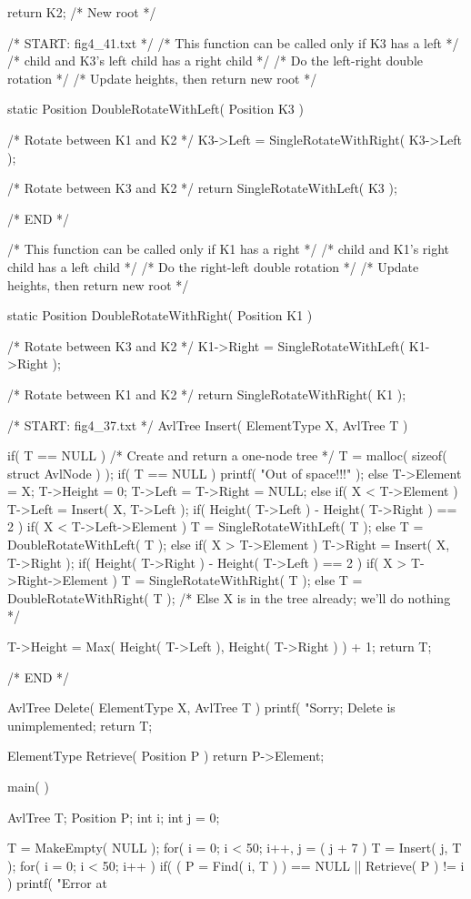 \documentclass[12pt, a4paper]{article}
\begin{document}
\begin{code}
{	return K2;  /* New root */
}

/* START: fig4_41.txt */
        /* This function can be called only if K3 has a left */
        /* child and K3's left child has a right child */
        /* Do the left-right double rotation */
        /* Update heights, then return new root */

static Position DoubleRotateWithLeft( Position K3 )
{
	/* Rotate between K1 and K2 */
	K3->Left = SingleRotateWithRight( K3->Left );

	/* Rotate between K3 and K2 */
	return SingleRotateWithLeft( K3 );
}
/* END */

/* This function can be called only if K1 has a right */
/* child and K1's right child has a left child */
/* Do the right-left double rotation */
/* Update heights, then return new root */

static Position DoubleRotateWithRight( Position K1 )
{
	/* Rotate between K3 and K2 */
	K1->Right = SingleRotateWithLeft( K1->Right );

	/* Rotate between K1 and K2 */
	return SingleRotateWithRight( K1 );
}


/* START: fig4_37.txt */
AvlTree Insert( ElementType X, AvlTree T )
{
	if( T == NULL )
	{
		/* Create and return a one-node tree */
		T = malloc( sizeof( struct AvlNode ) );
		if( T == NULL )
			printf( "Out of space!!!" );
		else
		{
			T->Element = X; T->Height = 0;
			T->Left = T->Right = NULL;
		}
	}
	else if( X < T->Element )
	{
		T->Left = Insert( X, T->Left );
		if( Height( T->Left ) - Height( T->Right ) == 2 )
			if( X < T->Left->Element )
				T = SingleRotateWithLeft( T );
			else
				T = DoubleRotateWithLeft( T );
	}
	else if( X > T->Element )
	{
		T->Right = Insert( X, T->Right );
		if( Height( T->Right ) - Height( T->Left ) == 2 )
			if( X > T->Right->Element )
				T = SingleRotateWithRight( T );
			else
				T = DoubleRotateWithRight( T );
	}
	/* Else X is in the tree already; we'll do nothing */

	T->Height = Max( Height( T->Left ), Height( T->Right ) ) + 1;
	return T;
}
/* END */

AvlTree Delete( ElementType X, AvlTree T )
{
	printf( "Sorry; Delete is unimplemented; %
	return T;
}

ElementType Retrieve( Position P )
{
	return P->Element;
}

main( )
{
    AvlTree T;
    Position P;
    int i;
    int j = 0;

    T = MakeEmpty( NULL );
    for( i = 0; i < 50; i++, j = ( j + 7 ) %
        T = Insert( j, T );
    for( i = 0; i < 50; i++ )
        if( ( P = Find( i, T ) ) == NULL || Retrieve( P ) != i )
            printf( "Error at %

}
\end{code}
\end{document}
